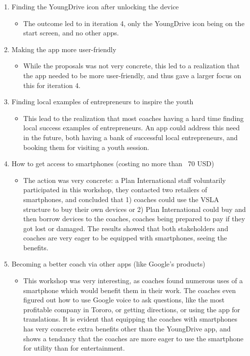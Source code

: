   \begin{enumerate}
  \item Finding the YoungDrive icon after unlocking the device
  \begin{itemize}
    \item The outcome led to in iteration 4, only the YoungDrive icon being on the start screen, and no other apps.
  \end{itemize}
  \item Making the app more user-friendly
  \begin{itemize}
    \item While the proposals was not very concrete, this led to a realization that the app needed to be more user-friendly, and thus gave a larger focus on this for iteration 4.
  \end{itemize}
  \item Finding local examples of entrepreneurs to inspire the youth
  \begin{itemize}
    \item This lead to the realization that most coaches having a hard time finding local success examples of entrepreneurs. An app could address this need in the future, both having a bank of successful local entrepreneurs, and booking them for visiting a youth session.
  \end{itemize}
  \item How to get access to smartphones (costing no more than ~70 USD)
  \begin{itemize}
    \item The action was very concrete: a Plan International staff voluntarily participated in this workshop, they contacted two retailers of smartphones, and concluded that 1) coaches could use the VSLA structure to buy their own devices or 2) Plan International could buy and then borrow devices to the coaches, coaches being prepared to pay if they got lost or damaged. The results showed that both stakeholders and coaches are very eager to be equipped with smartphones, seeing the benefits.
  \end{itemize}
  \item Becoming a better coach via other apps (like Google's products)
  \begin{itemize}
    \item This workshop was very interesting, as coaches found numerous uses of a smartphone which would benefit them in their work. The coaches even figured out how to use Google voice to ask questions, like the most profitable company in Tororo, or getting directions, or using the app for translations. It is evident that equipping the coaches with smartphones has very concrete extra benefits other than the YoungDrive app, and shows a tendancy that the coaches are more eager to use the smartphone for utility than for entertainment.
  \end{itemize}
  \end{enumerate}

